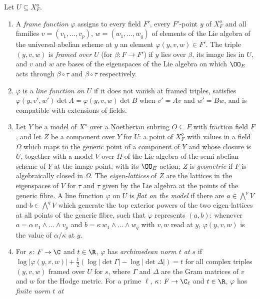 \begin{definition}\label{pf:covol:def:framefn}
Let $U\subseteq X^o_F$.
\begin{enumerate}[label=(\alph*)]
\item A \emph{frame function} $\varphi$ assigns to every field $F'$, every $F'$-point $y$ of $X^o_F$ and all
  families $v=(v_1,\dots,v_p)$, $w=(w_1,\dots,w_q)$ of elements of the Lie algebra of the universal abelian
  scheme at $y$ an element $\varphi(y,v,w)\in F'$. The triple $(y,v,w)$ is \emph{framed over $U$} (for
  $\beta\colon F\to F'$) if $y$ lies over $\beta$, its image lies in $U$, and $v$ and $w$ are bases of the
  eigenspaces of the Lie algebra on which $\OO_E$ acts through $\beta\circ\tau$ and
  $\beta\circ\bar\tau$ respectively.
\item $\varphi$ is a \emph{line function on $U$} if it does not vanish at framed triples, satisfies
  $\varphi(y,v',w')\det A=\varphi(y,v,w)\det B$ when $v'=Av$ and $w'=Bw$, and is compatible with extensions of
  fields.
\item Let $Y$ be a model of $X^o$ over a Noetherian subring $O\subseteq F$ with fraction field $F$, and let
  $Z$ be a component over $Y$ for $U$: a point of $X^o_F$ with values in a field $\Omega$ which maps to the
  generic point of a component of $Y$ and whose closure is $U$, together with a model $V$ over $\Omega$ of the
  Lie algebra of the semi-abelian scheme of $Y$ at the image point, with its $\OO_E$-action; $Z$ is \emph{geometric} if $F$ is algebraically closed in $\Omega$.
  The \emph{eigen-lattices} of $Z$ are the lattices in the eigenspaces of $V$ for $\tau$ and $\bar\tau$
  given by the Lie algebra at the points of the generic fibre. A line function $\varphi$ on $U$ is
  \emph{flat on the model} if there are $a\in\bigwedge^pV$ and $b\in\bigwedge^qV$ which generate the top
  exterior powers of the two eigen-lattices at all points of the generic fibre, such that $\varphi$
  represents $(a,b)$: whenever $a=\alpha\,v_1\wedge\dots\wedge v_p$ and $b=\kappa\,w_1\wedge\dots\wedge w_q$
  with $v,w$ read at $y$, $\varphi(y,v,w)$ is the value of $\alpha/\kappa$ at $y$.
\item For $s\colon F\to\C$ and $t\in\R$, $\varphi$ has \emph{archimedean norm $t$ at $s$} if
  $\log|\varphi(y,v,w)|+\frac12(\log|\det\Gamma|-\log|\det\Delta|)=t$ for all complex triples $(y,v,w)$
  framed over $U$ for $s$, where $\Gamma$ and $\Delta$ are the Gram matrices of $v$ and $w$ for the Hodge
  metric. For a prime $\ell$, $\kappa\colon F\to\C_\ell$ and $t\in\R$, $\varphi$ has \emph{finite norm $t$ at
}
\end{enumerate}
\end{definition}
